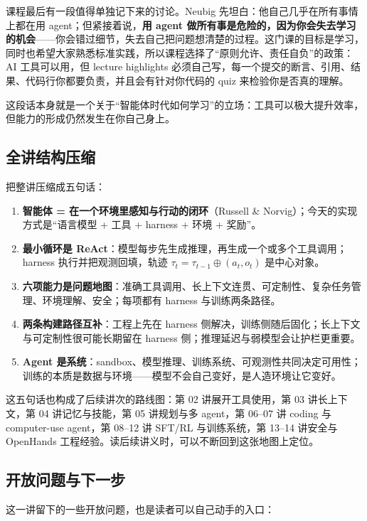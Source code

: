 \documentclass[a4paper]{article}
\begin{document}
课程最后有一段值得单独记下来的讨论。Neubig 先坦白：他自己几乎在所有事情上都在用 agent；但紧接着说，\textbf{用 agent 做所有事是危险的，因为你会失去学习的机会}——你会错过细节，失去自己把问题想清楚的过程。这门课的目标是学习，同时也希望大家熟悉标准实践，所以课程选择了“原则允许、责任自负”的政策：AI 工具可以用，但 lecture highlights 必须自己写，每一个提交的断言、引用、结果、代码行你都要负责，并且会有针对你代码的 quiz 来检验你是否真的理解。

这段话本身就是一个关于“智能体时代如何学习”的立场：工具可以极大提升效率，但能力的形成仍然发生在你自己身上。

\subsection{全讲结构压缩}

把整讲压缩成五句话：

\begin{enumerate}
\item \textbf{智能体 = 在一个环境里感知与行动的闭环}（Russell \& Norvig）；今天的实现方式是“语言模型 + 工具 + harness + 环境 + 奖励”。
\item \textbf{最小循环是 ReAct}：模型每步先生成推理，再生成一个或多个工具调用；harness 执行并把观测回填，轨迹 $\tau_t = \tau_{t-1} \oplus (a_t, o_t)$ 是中心对象。
\item \textbf{六项能力是问题地图}：准确工具调用、长上下文连贯、可定制性、复杂任务管理、环境理解、安全；每项都有 harness 与训练两条路径。
\item \textbf{两条构建路径互补}：工程上先在 harness 侧解决，训练侧随后固化；长上下文与可定制性很可能长期留在 harness 侧；推理延迟与弱模型会让护栏更重要。
\item \textbf{Agent 是系统}：sandbox、模型推理、训练系统、可观测性共同决定可用性；训练的本质是数据与环境——模型不会自己变好，是人造环境让它变好。
\end{enumerate}

这五句话也构成了后续讲次的路线图：第 02 讲展开工具使用，第 03 讲长上下文，第 04 讲记忆与技能，第 05 讲规划与多 agent，第 06–07 讲 coding 与 computer-use agent，第 08–12 讲 SFT/RL 与训练系统，第 13–14 讲安全与 OpenHands 工程经验。读后续讲义时，可以不断回到这张地图上定位。

\subsection{开放问题与下一步}

这一讲留下的一些开放问题，也是读者可以自己动手的入口：
\end{document}
